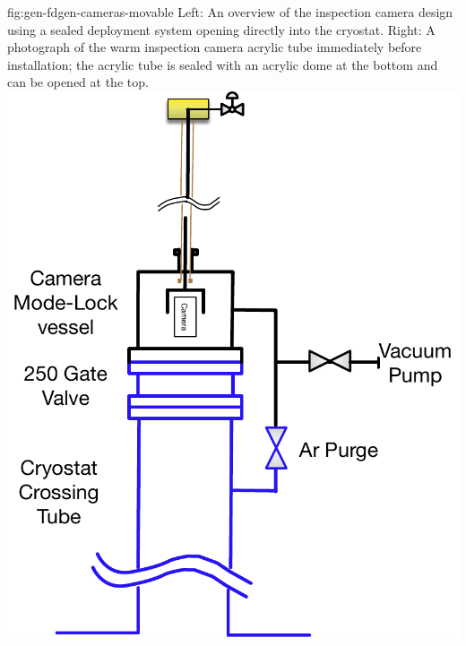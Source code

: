 \begin{dunefigure}{fig:gen-fdgen-cameras-movable}
  {Left: An overview of the inspection camera design using a sealed deployment system opening directly into the cryostat. Right: A photograph of the  warm inspection camera acrylic tube immediately before installation; the acrylic tube is sealed with an acrylic dome at the bottom and can be opened at the top.}
  \includegraphics[height=0.3\textheight]{graphics/Camera-Sketch}%

\end{dunefigure}
